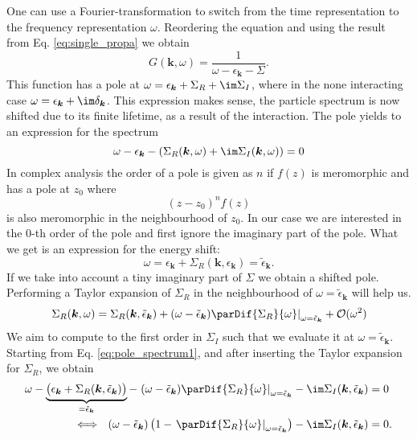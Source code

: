 \documentclass[../main.tex]{subfile}
\begin{document}
One can use a Fourier-transformation to switch from the time representation to the frequency representation $\omega$. Reordering the equation and using the result
from Eq. \ref{eq:single_propa} we obtain
\[
    G(\bm{k},\omega) = \frac{1}{\omega - \epsilon_{\bm{k}} - \Sigma}.
\]
This function has a pole at $\omega = \epsilon_{\bm{k}} + \Sigma_R + \im \Sigma_I$, where in the none interacting case $\omega = \epsilon_{\bm{k}} + \im\delta_{\bm{k}}$.
This expression makes sense, the particle spectrum is now shifted due to its finite lifetime, as a result of the interaction.
The pole yields to an expression for the spectrum
\begin{equation} \label{eq:pole_spectrum1}
    \omega - \epsilon_{\bm{k}} - \left(\Sigma_R(\bm{k},\omega) + \im \Sigma_I(\bm{k},\omega)\right) = 0
\end{equation}
In complex analysis the order of a pole is given as $n$ if $f(z)$ is meromorphic and has a pole at $z_0$ where
\[
    (z-z_0)^n f(z)
\]
is also meromorphic in the neighbourhood of $z_0$. In our case we are interested in the 0-th order of the pole and first ignore the imaginary part of the pole.
What we get
is an expression for the energy shift:
\[
    \omega = \epsilon_{\bm{k}} + \Sigma_R(\bm{k}, \epsilon_{\bm{k}}) = \tilde{\epsilon}_{\bm{k}}.  
\]
If we take into account a tiny imaginary part of $\Sigma$ we obtain a shifted pole. Performing a Taylor expansion of 
$\Sigma_{R}$ in the neighbourhood of $\omega = \tilde{\epsilon}_{\bm{k}}$ will help us.
\begin{equation*}
    \left.\Sigma_R(\bm{k}, \omega) = \Sigma_R(\bm{k}, \tilde{\epsilon}_{\bm{k}}) + (\omega - \tilde{\epsilon}_{\bm{k}}) \parDif{\Sigma_R}{\omega}\right|_{\omega= \tilde{\epsilon}_{\bm{k}}} + \mathcal{O}(\omega^2)
\end{equation*}
We aim to compute to the first order in $\Sigma_I$ such that we evaluate it at $\omega = \tilde{\epsilon}_{\bm{k}}$. 
Starting from Eq. \ref{eq:pole_spectrum1}, and after inserting the Taylor expansion for $\Sigma_R$, we obtain
\begin{equation}
    \begin{aligned}
        \omega - \underbrace{\bigl(\epsilon_{\bm{k}} + \Sigma_R(\bm{k}, \tilde{\epsilon}_{\bm{k}})\bigr)}_{=  \tilde{\epsilon}_{\bm{k}}} 
        - \left.(\omega - \tilde{\epsilon}_{\bm{k}}) \parDif{\Sigma_R}{\omega}\right|_{\omega= \tilde{\epsilon}_{\bm{k}}} - \im \Sigma_I(\bm{k}, \tilde{\epsilon}_{\bm{k}}) &= 0\\
        \Longleftrightarrow ~~ (\omega - \tilde{\epsilon}_{\bm{k}}) \left(1 - \left.\parDif{\Sigma_R}{\omega}\right|_{\omega= \tilde{\epsilon}_{\bm{k}}}\right) - \im \Sigma_I(\bm{k}, \tilde{\epsilon}_{\bm{k}}) &= 0.
    \end{aligned}
\end{equation}
\end{document}
